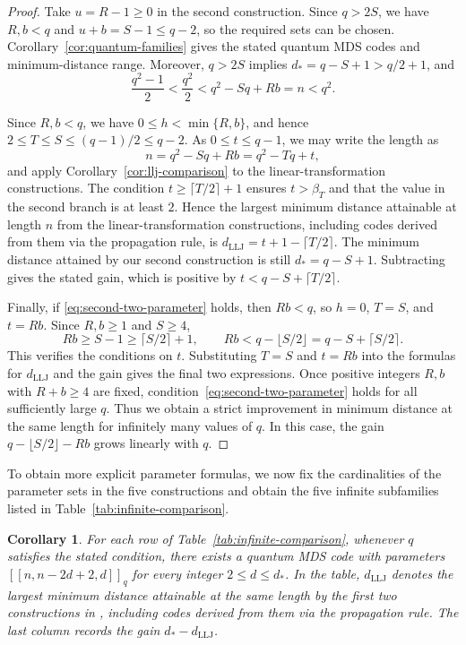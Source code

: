 \documentclass[preprint,12pt,a4paper]{elsarticle}
\newtheorem{corollary}[theorem]{Corollary}
\newcommand{\qcode}[3]{\left[\!\left[#1,#2,#3\right]\!\right]_q}
\begin{document}
\begin{proof}
Take $u=R-1\ge0$ in the second construction. Since $q>2S$, we have $R,b<q$ and $u+b=S-1\le q-2$, so the required sets can be chosen. Corollary~\ref{cor:quantum-families} gives the stated quantum MDS codes and minimum-distance range. Moreover, $q>2S$ implies $d_*=q-S+1>q/2+1$, and
\[
 \frac{q^2-1}{2}<\frac{q^2}{2}<q^2-Sq+Rb=n<q^2.
\]

Since $R,b<q$, we have $0\le h<\min\{R,b\}$, and hence $2\le T\le S\le(q-1)/2\le q-2$. As $0\le t\le q-1$, we may write the length as
\[
 n=q^2-Sq+Rb=q^2-Tq+t,
\]
and apply Corollary~\ref{cor:llj-comparison} to the linear-transformation constructions. The condition $t\ge\lceil T/2\rceil+1$ ensures $t>\beta_T$ and that the value in the second branch is at least $2$. Hence the largest minimum distance attainable at length $n$ from the linear-transformation constructions, including codes derived from them via the propagation rule, is $d_{\mathrm{LLJ}}=t+1-\lceil T/2\rceil$. The minimum distance attained by our second construction is still $d_*=q-S+1$. Subtracting gives the stated gain, which is positive by $t<q-S+\lceil T/2\rceil$.

Finally, if \eqref{eq:second-two-parameter} holds, then $Rb<q$, so $h=0$, $T=S$, and $t=Rb$. Since $R,b\ge1$ and $S\ge4$,
\[
 Rb\ge S-1\ge\lceil S/2\rceil+1,
 \qquad
 Rb<q-\lfloor S/2\rfloor=q-S+\lceil S/2\rceil.
\]
This verifies the conditions on $t$. Substituting $T=S$ and $t=Rb$ into the formulas for $d_{\mathrm{LLJ}}$ and the gain gives the final two expressions. Once positive integers $R,b$ with $R+b\ge4$ are fixed, condition~\eqref{eq:second-two-parameter} holds for all sufficiently large $q$. Thus we obtain a strict improvement in minimum distance at the same length for infinitely many values of $q$. In this case, the gain $q-\lfloor S/2\rfloor-Rb$ grows linearly with $q$.
\end{proof}

To obtain more explicit parameter formulas, we now fix the cardinalities of the parameter sets in the five constructions and obtain the five infinite subfamilies listed in Table~\ref{tab:infinite-comparison}.
\begin{corollary}\label{cor:infinite-comparison}
For each row of Table~\ref{tab:infinite-comparison}, whenever $q$ satisfies the stated condition, there exists a quantum MDS code with parameters $\qcode{n}{n-2d+2}{d}$ for every integer $2\le d\le d_*$. In the table, $d_{\mathrm{LLJ}}$ denotes the largest minimum distance attainable at the same length by the first two constructions in \cite[Corollary~4.9]{LiLiuJiang2026}, including codes derived from them via the propagation rule. The last column records the gain $d_*-d_{\mathrm{LLJ}}$.
\end{corollary}
\end{document}
